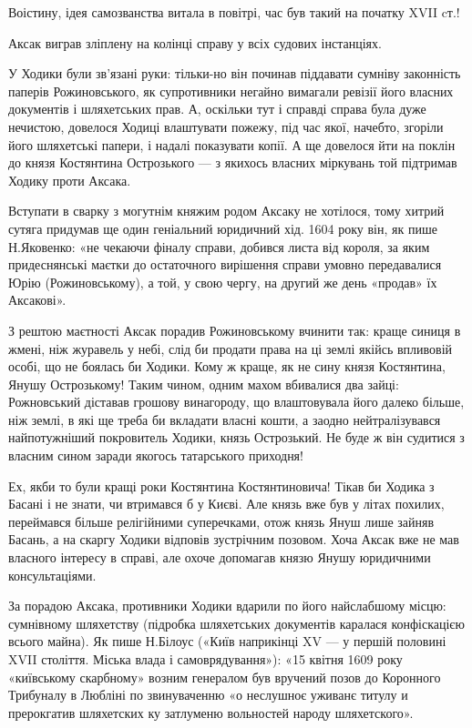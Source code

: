 Воістину, ідея самозванства витала в повітрі, час був такий на початку XVII
cт.! 

Аксак виграв зліплену на колінці справу у всіх судових інстанціях. 

У Ходики були зв’язані руки: тільки-но він починав піддавати сумніву законність
паперів Рожиновського, як супротивники негайно вимагали ревізії його власних
документів і шляхетських прав. А, оскільки тут і справді справа була дуже
нечистою, довелося Ходиці влаштувати пожежу, під час якої, начебто, згоріли
його шляхетські папери, і надалі показувати копії. А ще довелося йти на поклін
до князя Костянтина Острозького — з якихось власних міркувань той підтримав
Ходику проти Аксака.

Вступати в сварку з могутнім княжим родом Аксаку не хотілося, тому хитрий
сутяга придумав ще один геніальний юридичний хід. 1604 року він, як пише
Н.Яковенко: «не чекаючи фіналу справи, добився листа від короля, за яким
придеснянські маєтки до остаточного вирішення справи умовно передавалися Юрію
(Рожиновському), а той, у свою чергу, на другий же день «продав» їх Аксакові». 

З рештою маєтності Аксак порадив Рожиновському вчинити так: краще синиця в
жмені, ніж журавель у небі, слід би продати права на ці землі якійсь впливовій
особі, що не боялась би Ходики. Кому ж краще, як не сину князя Костянтина,
Янушу Острозькому! Таким чином, одним махом вбивалися два зайці: Рожновський
діставав грошову винагороду, що влаштовувала його далеко більше, ніж землі, в
які ще треба би вкладати власні кошти, а заодно нейтралізувався найпотужніший
покровитель Ходики, князь Острозький. Не буде ж він судитися з власним сином
заради якогось татарського приходня!

Ех, якби то були кращі роки Костянтина Костянтиновича! Тікав би Ходика з Басані
і не знати, чи втримався б у Києві. Але князь вже був у літах похилих,
переймався більше релігійними суперечками, отож князь Януш лише зайняв Басань,
а на скаргу Ходики відповів зустрічним позовом. Хоча Аксак вже не мав власного
інтересу в справі, але охоче допомагав князю Янушу юридичними консультаціями. 

За порадою Аксака, противники Ходики вдарили по його найслабшому місцю:
сумнівному шляхетству (підробка шляхетських документів каралася конфіскацією
всього майна). Як пише Н.Білоус («Київ наприкінці XV — у першій половині XVII
століття. Міська влада і самоврядування»): «15 квітня 1609 року «київському
скарбному» возним генералом був вручений позов до Коронного Трибуналу в Любліні
по звинуваченню «о неслушноє уживанє титулу и прерокгатив шляхетских ку
затлуменю вольностей народу шляхетского». 

